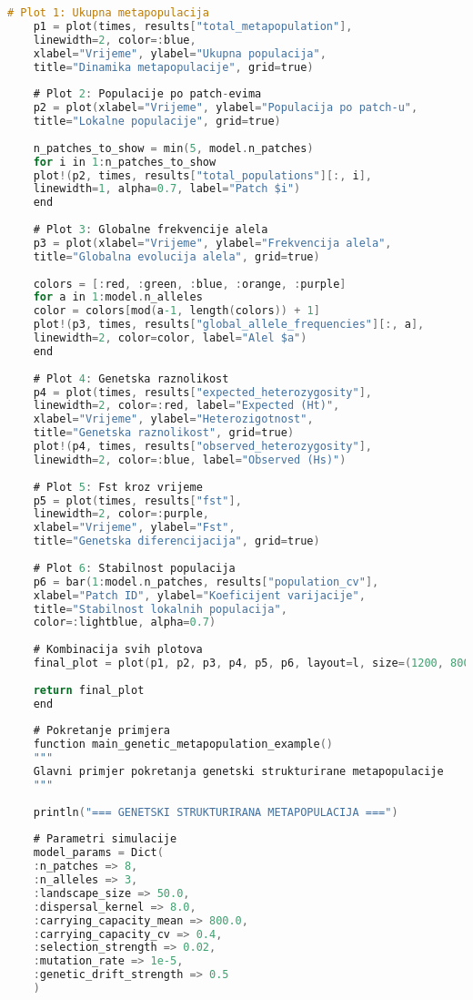 \documentclass[11pt,oneside]{book}
\begin{document}
\begin{lstlisting}[language=C, caption=Julia implementacija genetski strukturiranog metapopulacijskog modela]
	# Plot 1: Ukupna metapopulacija
	p1 = plot(times, results["total_metapopulation"], 
	linewidth=2, color=:blue,
	xlabel="Vrijeme", ylabel="Ukupna populacija",
	title="Dinamika metapopulacije", grid=true)
	
	# Plot 2: Populacije po patch-evima
	p2 = plot(xlabel="Vrijeme", ylabel="Populacija po patch-u",
	title="Lokalne populacije", grid=true)
	
	n_patches_to_show = min(5, model.n_patches)
	for i in 1:n_patches_to_show
	plot!(p2, times, results["total_populations"][:, i], 
	linewidth=1, alpha=0.7, label="Patch $i")
	end
	
	# Plot 3: Globalne frekvencije alela
	p3 = plot(xlabel="Vrijeme", ylabel="Frekvencija alela",
	title="Globalna evolucija alela", grid=true)
	
	colors = [:red, :green, :blue, :orange, :purple]
	for a in 1:model.n_alleles
	color = colors[mod(a-1, length(colors)) + 1]
	plot!(p3, times, results["global_allele_frequencies"][:, a], 
	linewidth=2, color=color, label="Alel $a")
	end
	
	# Plot 4: Genetska raznolikost
	p4 = plot(times, results["expected_heterozygosity"], 
	linewidth=2, color=:red, label="Expected (Ht)",
	xlabel="Vrijeme", ylabel="Heterozigotnost",
	title="Genetska raznolikost", grid=true)
	plot!(p4, times, results["observed_heterozygosity"], 
	linewidth=2, color=:blue, label="Observed (Hs)")
	
	# Plot 5: Fst kroz vrijeme
	p5 = plot(times, results["fst"], 
	linewidth=2, color=:purple,
	xlabel="Vrijeme", ylabel="Fst",
	title="Genetska diferencijacija", grid=true)
	
	# Plot 6: Stabilnost populacija
	p6 = bar(1:model.n_patches, results["population_cv"],
	xlabel="Patch ID", ylabel="Koeficijent varijacije",
	title="Stabilnost lokalnih populacija", 
	color=:lightblue, alpha=0.7)
	
	# Kombinacija svih plotova
	final_plot = plot(p1, p2, p3, p4, p5, p6, layout=l, size=(1200, 800))
	
	return final_plot
	end
	
	# Pokretanje primjera
	function main_genetic_metapopulation_example()
	"""
	Glavni primjer pokretanja genetski strukturirane metapopulacije
	"""
	
	println("=== GENETSKI STRUKTURIRANA METAPOPULACIJA ===")
	
	# Parametri simulacije
	model_params = Dict(
	:n_patches => 8,
	:n_alleles => 3,
	:landscape_size => 50.0,
	:dispersal_kernel => 8.0,
	:carrying_capacity_mean => 800.0,
	:carrying_capacity_cv => 0.4,
	:selection_strength => 0.02,
	:mutation_rate => 1e-5,
	:genetic_drift_strength => 0.5
	)
	

\end{lstlisting}
\end{document}
